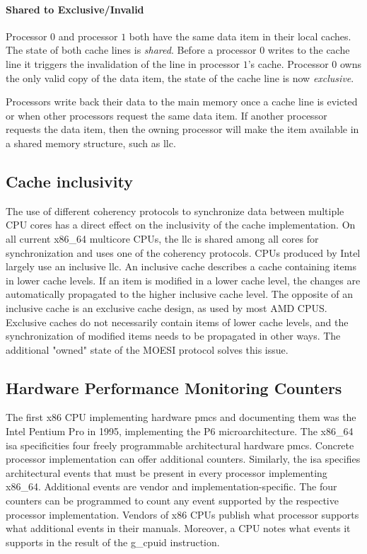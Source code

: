 \paragraph{Shared to Exclusive/Invalid}
Processor $0$ and processor $1$ both have the same data item in their local
caches. The state of both cache lines is \textit{shared}. Before a  processor
$0$ writes to the cache line it triggers the invalidation of the line in
processor $1$'s cache. Processor $0$ owns the only valid copy of the data item,
the state of the cache line is now \textit{exclusive}.

Processors write back their data to the main memory once a cache line is evicted
or when other processors request the same data item. If another processor
requests the data item, then the owning processor will make the item available
in a shared memory structure, such as \gls{llc}.

\subsection{Cache inclusivity}
\label{sec:state:technical:caches_inclusivity}
The use of different coherency protocols to synchronize data between multiple
CPU cores has a direct effect on the inclusivity of the cache implementation. On
all current x86\_64 multicore CPUs, the \gls{llc} is shared among all cores for
synchronization and uses one of the coherency protocols. CPUs produced by Intel
largely use an inclusive \gls{llc}. An inclusive cache describes a cache
containing items in lower cache levels. If an item is modified in a lower cache
level, the changes are automatically propagated to the higher inclusive cache
level. The opposite of an inclusive cache is an exclusive cache design, as used
by most AMD CPUS. Exclusive caches do not necessarily contain items of lower
cache levels, and the synchronization of modified items needs to be propagated
in other ways. The additional "owned" state of the MOESI protocol solves this
issue.

\subsection{Hardware Performance Monitoring Counters}
\label{sec:state:technical:hpc}
The first x86 CPU implementing hardware \glspl{pmc} and
documenting them was the Intel Pentium Pro in 1995, implementing the P6
microarchitecture.\cite{intel_sdm} The x86\_64 \gls{isa} specificities
four freely programmable architectural hardware
\glspl{pmc}.\cite{amd_manual} Concrete processor implementation can offer
additional counters. Similarly, the \gls{isa} specifies architectural
events that must be present in every processor implementing x86\_64. Additional
events are vendor and implementation-specific. The four counters can be
programmed to count any event supported by the respective processor
implementation. Vendors of x86 CPUs publish what processor supports what
additional events in their manuals. Moreover, a CPU notes what events it
supports in the result of the \gls{g_cpuid} instruction. \\


